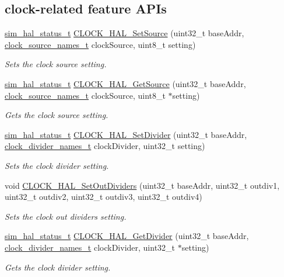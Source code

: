 \subsection*{clock-\/related feature A\+P\+Is}
\begin{DoxyCompactItemize}
\item 
\hyperlink{group__sim__hal_ga7e691721ba86531e94387971c652aa08}{sim\+\_\+hal\+\_\+status\+\_\+t} \hyperlink{group__sim__hal_ga1cbc3930bced80e4db49e5865f3c8cec}{C\+L\+O\+C\+K\+\_\+\+H\+A\+L\+\_\+\+Set\+Source} (uint32\+\_\+t base\+Addr, \hyperlink{group__sim__hal_ga9c9127c1f219ab5bfb55d7041124a8bf}{clock\+\_\+source\+\_\+names\+\_\+t} clock\+Source, uint8\+\_\+t setting)
\begin{DoxyCompactList}\small\item\em Sets the clock source setting. \end{DoxyCompactList}\item 
\hyperlink{group__sim__hal_ga7e691721ba86531e94387971c652aa08}{sim\+\_\+hal\+\_\+status\+\_\+t} \hyperlink{group__sim__hal_ga9efee2869120ab9cd7862501d88b4883}{C\+L\+O\+C\+K\+\_\+\+H\+A\+L\+\_\+\+Get\+Source} (uint32\+\_\+t base\+Addr, \hyperlink{group__sim__hal_ga9c9127c1f219ab5bfb55d7041124a8bf}{clock\+\_\+source\+\_\+names\+\_\+t} clock\+Source, uint8\+\_\+t $\ast$setting)
\begin{DoxyCompactList}\small\item\em Gets the clock source setting. \end{DoxyCompactList}\item 
\hyperlink{group__sim__hal_ga7e691721ba86531e94387971c652aa08}{sim\+\_\+hal\+\_\+status\+\_\+t} \hyperlink{group__sim__hal_ga8093fcb014483c7b7a37b21c46290af7}{C\+L\+O\+C\+K\+\_\+\+H\+A\+L\+\_\+\+Set\+Divider} (uint32\+\_\+t base\+Addr, \hyperlink{group__sim__hal_ga51a225b8eb0e0d00e7911b3603d7caa2}{clock\+\_\+divider\+\_\+names\+\_\+t} clock\+Divider, uint32\+\_\+t setting)
\begin{DoxyCompactList}\small\item\em Sets the clock divider setting. \end{DoxyCompactList}\item 
void \hyperlink{group__sim__hal_ga302e0b15c1f073aa8b36e5e76aa3a219}{C\+L\+O\+C\+K\+\_\+\+H\+A\+L\+\_\+\+Set\+Out\+Dividers} (uint32\+\_\+t base\+Addr, uint32\+\_\+t outdiv1, uint32\+\_\+t outdiv2, uint32\+\_\+t outdiv3, uint32\+\_\+t outdiv4)
\begin{DoxyCompactList}\small\item\em Sets the clock out dividers setting. \end{DoxyCompactList}\item 
\hyperlink{group__sim__hal_ga7e691721ba86531e94387971c652aa08}{sim\+\_\+hal\+\_\+status\+\_\+t} \hyperlink{group__sim__hal_ga6337f73b64becb7fed810b37551b3496}{C\+L\+O\+C\+K\+\_\+\+H\+A\+L\+\_\+\+Get\+Divider} (uint32\+\_\+t base\+Addr, \hyperlink{group__sim__hal_ga51a225b8eb0e0d00e7911b3603d7caa2}{clock\+\_\+divider\+\_\+names\+\_\+t} clock\+Divider, uint32\+\_\+t $\ast$setting)
\begin{DoxyCompactList}\small\item\em Gets the clock divider setting. \end{DoxyCompactList}\end{DoxyCompactItemize}
